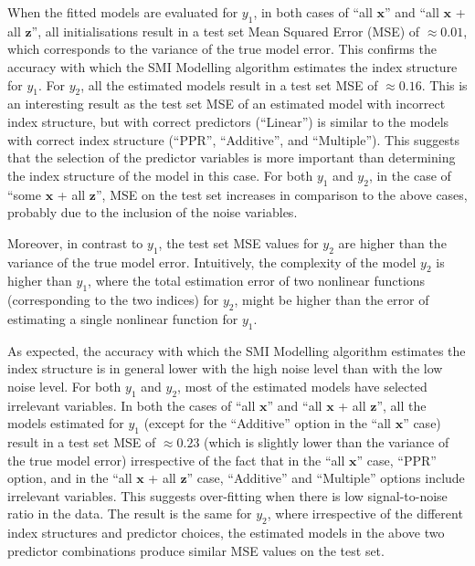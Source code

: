 \documentclass[
  11pt,
  a4paper,
]{article}
\begin{document}
When the fitted models are evaluated for \(y_{1}\), in both cases of
``all \(\bm{x}\)'' and ``all \(\bm{x}\) + all \(\bm{z}\)'', all
initialisations result in a test set Mean Squared Error (MSE) of
\(\approx 0.01\), which corresponds to the variance of the true model
error. This confirms the accuracy with which the SMI Modelling algorithm
estimates the index structure for \(y_{1}\). For \(y_{2}\), all the
estimated models result in a test set MSE of \(\approx 0.16\). This is
an interesting result as the test set MSE of an estimated model with
incorrect index structure, but with correct predictors (``Linear'') is
similar to the models with correct index structure (``PPR'',
``Additive'', and ``Multiple''). This suggests that the selection of the
predictor variables is more important than determining the index
structure of the model in this case. For both \(y_{1}\) and \(y_{2}\),
in the case of ``some \(\bm{x}\) + all \(\bm{z}\)'', MSE on the test set
increases in comparison to the above cases, probably due to the
inclusion of the noise variables.

Moreover, in contrast to \(y_{1}\), the test set MSE values for
\(y_{2}\) are higher than the variance of the true model error.
Intuitively, the complexity of the model \(y_{2}\) is higher than
\(y_{1}\), where the total estimation error of two nonlinear functions
(corresponding to the two indices) for \(y_{2}\), might be higher than
the error of estimating a single nonlinear function for \(y_{1}\).

As expected, the accuracy with which the SMI Modelling algorithm
estimates the index structure is in general lower with the high noise
level than with the low noise level. For both \(y_{1}\) and \(y_{2}\),
most of the estimated models have selected irrelevant variables. In both
the cases of ``all \(\bm{x}\)'' and ``all \(\bm{x}\) + all \(\bm{z}\)'',
all the models estimated for \(y_{1}\) (except for the ``Additive''
option in the ``all \(\bm{x}\)'' case) result in a test set MSE of
\(\approx 0.23\) (which is slightly lower than the variance of the true
model error) irrespective of the fact that in the ``all \(\bm{x}\)''
case, ``PPR'' option, and in the ``all \(\bm{x}\) + all \(\bm{z}\)''
case, ``Additive'' and ``Multiple'' options include irrelevant
variables. This suggests over-fitting when there is low signal-to-noise
ratio in the data. The result is the same for \(y_{2}\), where
irrespective of the different index structures and predictor choices,
the estimated models in the above two predictor combinations produce
similar MSE values on the test set.
\end{document}

